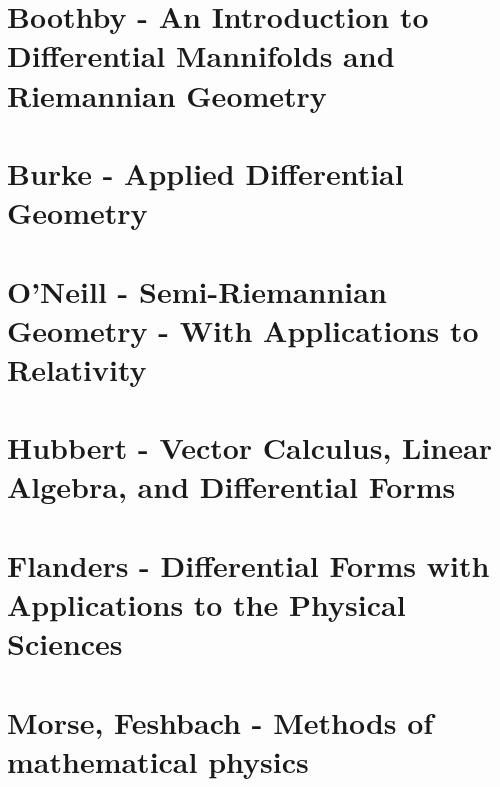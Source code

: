 \documentclass[10pt,a4paper]{book}
\theoremstyle{definition}
\begin{document}
\section{{\sc Boothby} - An Introduction to Differential Mannifolds and Riemannian Geometry}

\section{{\sc Burke} - Applied Differential Geometry}

\section{{\sc O'Neill} - Semi-Riemannian Geometry - With Applications to Relativity}

\section{{\sc Hubbert} - Vector Calculus, Linear Algebra, and Differential Forms}

\section{{\sc Flanders} - Differential Forms with Applications to the Physical Sciences}

\section{{\sc Morse, Feshbach} - Methods of mathematical physics}
\end{document}
